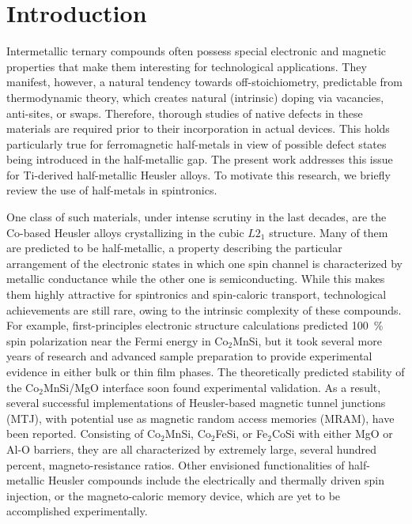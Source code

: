 \documentclass[aps,prb,twocolumn,superscriptaddress,showpacs]{revtex4}
\begin{document}

\section{Introduction}\label{SecIntro}

Intermetallic ternary compounds often possess
special electronic and magnetic properties that make them interesting
for technological applications. They manifest, however,
a natural tendency towards off-stoichiometry, predictable 
from thermodynamic theory, which creates natural (intrinsic)
doping via vacancies, anti-sites, or swaps.\cite{YZZ17}
Therefore, thorough studies of native defects in these materials 
are required prior to their incorporation in actual devices.
This holds particularly true for ferromagnetic half-metals in view of
possible defect states being introduced in the half-metallic gap.
The present work addresses this issue for Ti-derived half-metallic
Heusler alloys. To motivate this research, we briefly review the use
of half-metals in spintronics.

One class of such materials, under intense scrutiny in the 
last decades, are the Co-based Heusler alloys\cite{KWS83,KFF07,GFP11} 
crystallizing in the cubic $L2_1$ structure. Many of them are 
predicted to be half-metallic, a property describing the particular 
arrangement of the electronic states in which one spin channel is
characterized by metallic conductance while the other one
is semiconducting. While this makes them highly attractive for 
spintronics and spin-caloric transport,
technological achievements are still rare,
owing to the intrinsic complexity of these compounds.
For example, first-principles electronic structure
calculations\cite{GDP02,GOAS06} predicted 
100~\% spin polarization near the Fermi energy in 
Co$_2$MnSi, but it took several more years of research and 
advanced sample preparation to provide experimental evidence 
in either bulk or thin film phases.\cite{YSK+12,JMB+14} 
The theoretically predicted stability of the Co$_2$MnSi/MgO 
interface\cite{HSK09a} soon found experimental validation.\cite{LTM+11}
As a result, several successful implementations
of Heusler-based magnetic tunnel junctions (MTJ),
with potential use as magnetic random access memories (MRAM),
have been reported.\cite{IIT+09,YSK+12,LHT+12,SMSR13}
Consisting of Co$_2$MnSi, Co$_2$FeSi, or Fe$_2$CoSi with 
either MgO or Al-O barriers, they are all characterized by extremely
large, several hundred percent, magneto-resistance ratios.
Other envisioned functionalities of
half-metallic Heusler compounds include
the electrically\cite{CGC+11} and 
thermally driven\cite{CGE+14,GKP14} spin injection,
or the magneto-caloric memory device,\cite{GK15} 
which are yet to be accomplished experimentally.
\end{document}

